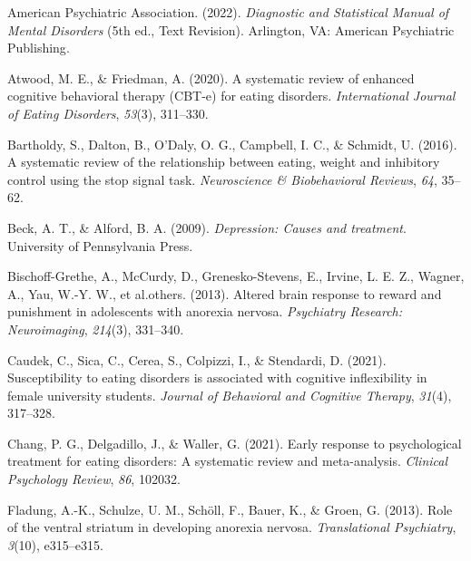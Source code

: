 \documentclass[
  man,floatsintext]{apa6}
\newlength{\cslhangindent}
\newlength{\cslentryspacingunit} %
\newenvironment{CSLReferences}[2] %
 {%
  \setlength{\parindent}{0pt}
  \ifodd #1
  \let\oldpar\par
  \def\par{\hangindent=\cslhangindent\oldpar}
  \fi
  \setlength{\parskip}{#2\cslentryspacingunit}
 }%
 {}
\begin{document}
\hypertarget{refs}{}
\begin{CSLReferences}{1}{0}
\leavevmode{}%
American Psychiatric Association. (2022). \emph{{Diagnostic and Statistical Manual of Mental Disorders}} (5th ed., Text Revision). Arlington, VA: {American Psychiatric Publishing}.

\leavevmode{}%
Atwood, M. E., \& Friedman, A. (2020). A systematic review of enhanced cognitive behavioral therapy (CBT-e) for eating disorders. \emph{International Journal of Eating Disorders}, \emph{53}(3), 311--330.

\leavevmode{}%
Bartholdy, S., Dalton, B., O'Daly, O. G., Campbell, I. C., \& Schmidt, U. (2016). A systematic review of the relationship between eating, weight and inhibitory control using the stop signal task. \emph{Neuroscience \& Biobehavioral Reviews}, \emph{64}, 35--62.

\leavevmode{}%
Beck, A. T., \& Alford, B. A. (2009). \emph{Depression: Causes and treatment}. University of Pennsylvania Press.

\leavevmode{}%
Bischoff-Grethe, A., McCurdy, D., Grenesko-Stevens, E., Irvine, L. E. Z., Wagner, A., Yau, W.-Y. W., et al.others. (2013). Altered brain response to reward and punishment in adolescents with anorexia nervosa. \emph{Psychiatry Research: Neuroimaging}, \emph{214}(3), 331--340.

\leavevmode{}%
Caudek, C., Sica, C., Cerea, S., Colpizzi, I., \& Stendardi, D. (2021). Susceptibility to eating disorders is associated with cognitive inflexibility in female university students. \emph{Journal of Behavioral and Cognitive Therapy}, \emph{31}(4), 317--328.

\leavevmode{}%
Chang, P. G., Delgadillo, J., \& Waller, G. (2021). Early response to psychological treatment for eating disorders: A systematic review and meta-analysis. \emph{Clinical Psychology Review}, \emph{86}, 102032.

\leavevmode{}%
Fladung, A.-K., Schulze, U. M., Schöll, F., Bauer, K., \& Groen, G. (2013). Role of the ventral striatum in developing anorexia nervosa. \emph{Translational Psychiatry}, \emph{3}(10), e315--e315.


\end{CSLReferences}
\end{document}

